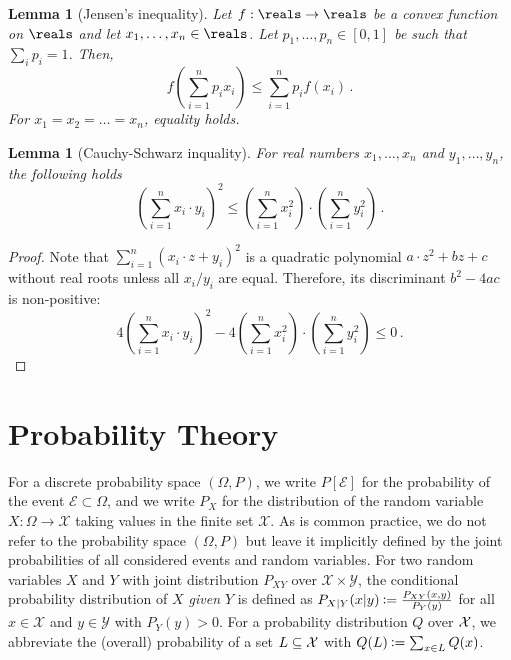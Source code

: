 \documentclass[final,11pt,a4paper]{report}
\newtheorem{lemma}[theorem]{Lemma}
\newcommand*{\assign}{\ensuremath{\kern.5ex\raisebox{.1ex}{\mbox{\rm:}}\kern -.3em =}}
\newcommand*{\cX}{\mathcal{X}}
\newcommand*{\cY}{\mathcal{Y}}
\newcommand*{\ev}{\ensuremath{\mathcal{E}}\xspace} %
\begin{document}
\begin{lemma}[Jensen's inequality] \label{lem:jensen}
Let $f: \reals \rightarrow \reals$ be a convex function on $\reals$ and let $x_1,
\ldots, x_n \in \reals$. Let $p_1, \ldots, p_n \in [0,1]$ be such that
$\sum_i p_i=1$. Then,
\[ f\left(\sum_{i=1}^n p_i x_i \right) \leq \sum_{i=1}^n p_i f(x_i) \,
.
\]
For $x_1=x_2=\ldots=x_n$, equality holds.
\end{lemma}

\begin{lemma}[Cauchy-Schwarz inquality] \label{lem:cauchyschwarz}
For real numbers $x_1,\ldots,x_n$ and $y_1,\ldots,y_n$, the following holds
\[ \left(\sum_{i=1}^n x_i \cdot y_i \right)^2 \leq \left(\sum_{i=1}^n x_i^2\right)
\cdot \left(\sum_{i=1}^n y_i^2\right) \, .
\]
\end{lemma}
\begin{proof}
Note that $\sum_{i=1}^n (x_i \cdot z + y_i)^2$ is a quadratic
polynomial $a \cdot z^2 + b z +c$ without real roots unless all
$x_i/y_i$ are equal. Therefore, its discriminant $b^2 - 4ac$ is non-positive:
\[ 4 \left(\sum_{i=1}^n x_i \cdot y_i \right)^2 - 4 \left(\sum_{i=1}^n
  x_i^2 \right) \cdot \left(\sum_{i=1}^n y_i^2 \right) \leq 0 \, .
\]
\end{proof}

\section{Probability Theory}
For a discrete probability space $(\Omega,P)$, we write $P[\ev]$ for
the probability of the \index{event $\ev$}event $\ev \subset \Omega$,
and we write $P_X$ for the distribution of the random variable $X:\Omega\to\cX$ taking
values in the finite set $\cX$. As is common practice, we do not refer
to the probability space $(\Omega,P)$ but leave it implicitly defined
by the joint probabilities of all considered events and random
variables. For two random variables $X$ and $Y$ with joint
distribution $P_{XY}$ over $\cX \times \cY$, the conditional
probability distribution of \emph{$X$ given $Y$} is defined as $P_{X |
  Y}(x|y) \assign \frac{P_{XY}(x,y)}{P_Y(y)}$ for all $x \in \cX$ and
$y \in \cY$ with $P_Y(y)>0$.  For a probability distribution $Q$ over
$\cal X$, we abbreviate the (overall) probability of a set $L
\subseteq \cal X$ with $Q(L) \assign \sum_{x \in L} Q(x)$.
\end{document}
